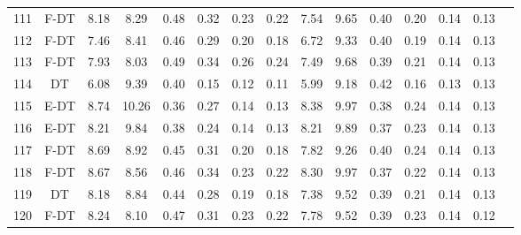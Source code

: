 \begin{longtable}{@{\hskip3pt}c@{\hskip3pt}c@{\hskip3pt}c@{\hskip3pt}c@{\hskip3pt}c@{\hskip3pt}c@{\hskip3pt}c@{\hskip3pt}c@{\hskip3pt}c@{\hskip3pt}c@{\hskip3pt}c@{\hskip3pt}c@{\hskip3pt}c@{\hskip3pt}c@{\hskip3pt}c}
        111 &           F-DT &              8.18 &        8.29 &          0.48 &        0.32 &        0.23 &         0.22 &                7.54 &        9.65 &          0.40 &        0.20 &        0.14 &         0.13 \\
        112 &           F-DT &              7.46 &        8.41 &          0.46 &        0.29 &        0.20 &         0.18 &                6.72 &        9.33 &          0.40 &        0.19 &        0.14 &         0.13 \\
        113 &           F-DT &              7.93 &        8.03 &          0.49 &        0.34 &        0.26 &         0.24 &                7.49 &        9.68 &          0.39 &        0.21 &        0.14 &         0.13 \\
        114 &             DT &              6.08 &        9.39 &          0.40 &        0.15 &        0.12 &         0.11 &                5.99 &        9.18 &          0.42 &        0.16 &        0.13 &         0.13 \\
        115 &           E-DT &              8.74 &       10.26 &          0.36 &        0.27 &        0.14 &         0.13 &                8.38 &        9.97 &          0.38 &        0.24 &        0.14 &         0.13 \\
        116 &           E-DT &              8.21 &        9.84 &          0.38 &        0.24 &        0.14 &         0.13 &                8.21 &        9.89 &          0.37 &        0.23 &        0.14 &         0.13 \\
        117 &           F-DT &              8.69 &        8.92 &          0.45 &        0.31 &        0.20 &         0.18 &                7.82 &        9.26 &          0.40 &        0.24 &        0.14 &         0.13 \\
        118 &           F-DT &              8.67 &        8.56 &          0.46 &        0.34 &        0.23 &         0.22 &                8.30 &        9.97 &          0.37 &        0.22 &        0.14 &         0.13 \\
        119 &             DT &              8.18 &        8.84 &          0.44 &        0.28 &        0.19 &         0.18 &                7.38 &        9.52 &          0.39 &        0.21 &        0.14 &         0.13 \\
        120 &           F-DT &              8.24 &        8.10 &          0.47 &        0.31 &        0.23 &         0.22 &                7.78 &        9.52 &          0.39 &        0.23 &        0.14 &         0.12 \\

\end{longtable}
